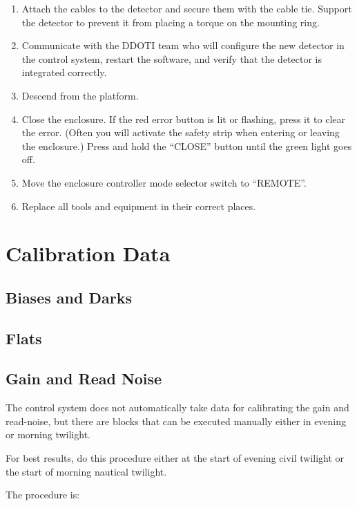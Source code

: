 \begin{enumerate}
\item Attach the cables to the detector and secure them with the cable tie. Support the detector to prevent it from placing a torque on the mounting ring.

\item Communicate with the DDOTI team who will configure the new detector in the control system, restart the software, and verify that the detector is integrated correctly.

\item Descend from the platform.

\item Close the enclosure. If the red error button is lit or flashing, press it to clear the error. (Often you will activate the safety strip when entering or leaving the enclosure.) Press and hold the “CLOSE” button until the green light goes off.

\item 
Move the enclosure controller mode selector switch to “REMOTE”.

\item
Replace all tools and equipment in their correct places.
\end{enumerate}

\section{Calibration Data}

\subsection{Biases and Darks}

\subsection{Flats}

\subsection{Gain and Read Noise}

The control system does not automatically take data for calibrating the gain and read-noise, but there are blocks that can be executed manually either in evening or morning twilight. 

For best results, do this procedure either at the start of evening civil twilight or the start of morning nautical twilight.

The procedure is:

